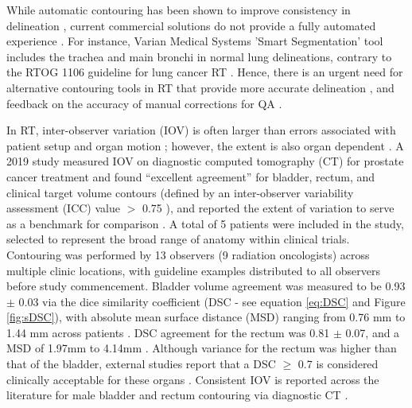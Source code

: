 While automatic contouring has been shown to improve consistency in delineation \cite{Vinod_2016}, current commercial solutions do not provide a fully automated experience \cite{Nemoto_2020}. For instance, Varian Medical Systems 'Smart Segmentation' tool includes the trachea and main bronchi in normal lung delineations, contrary to the RTOG 1106 guideline for lung cancer RT \cite{Nemoto_2020}. Hence, there is an urgent need for alternative contouring tools in RT that provide more accurate delineation \cite{Nemoto_2020}, and feedback on the accuracy of manual corrections for QA \cite{Nikolov_2018}.

In RT, inter-observer variation (IOV) is often larger than errors associated with patient setup and organ motion \cite{Vinod_2016, Murakami2013}; however, the extent is also organ dependent \cite{Roach_2019}. A 2019 study measured IOV on diagnostic computed tomography (CT) for prostate cancer treatment and found ``excellent agreement'' for bladder, rectum, and clinical target volume contours (defined by an inter-observer variability assessment (ICC) value $>$ 0.75 ), and reported the extent of variation to serve as a benchmark for comparison \cite{Roach_2019}.  A total of 5 patients were included in the study, selected to represent the broad range of anatomy within clinical trials. Contouring was performed by 13  observers (9 radiation oncologists) across multiple clinic locations, with guideline examples distributed to all observers before study commencement. Bladder volume agreement was measured to be 0.93 $\pm$ 0.03 via the dice similarity coefficient (DSC \cite{Dice1945} - see equation \ref{eq:DSC} and Figure \ref{fig:sDSC}), with absolute mean surface distance (MSD) ranging from 0.76 mm to 1.44 mm across patients \cite{Roach_2019}. DSC agreement for the rectum was  0.81 $\pm$ 0.07, and a MSD of 1.97mm to 4.14mm \cite{Roach_2019}. Although variance for the rectum was higher than that of the bladder, external studies report that a DSC $\geq$ 0.7 is considered clinically acceptable for these organs \cite{Roach_2019, Sharp2014}. Consistent IOV is reported across the literature for male bladder and rectum contouring via diagnostic CT \cite{Riegal2016}.

